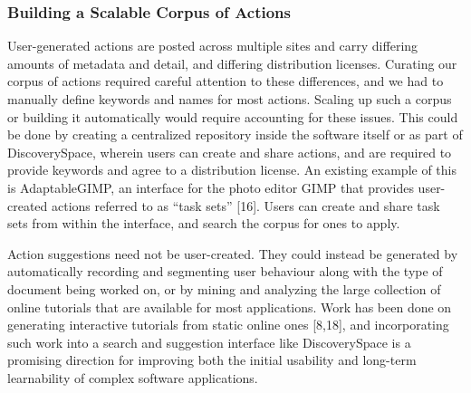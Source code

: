 \subsubsection{Building a Scalable Corpus of Actions}
User-generated actions are posted across multiple sites and carry differing amounts of metadata and detail, and differing distribution licenses. Curating our corpus of actions required careful attention to these differences, and we had to manually define keywords and names for most actions. Scaling up such a corpus or building it automatically would require accounting for these issues. This could be done by creating a centralized repository inside the software itself or as part of Discovery\-Space, wherein users can create and share actions, and are required to provide keywords and agree to a distribution license. An existing example of this is AdaptableGIMP, an interface for the photo editor GIMP that provides user-created actions referred to as ``task sets'' [16]. Users can create and share task sets from within the interface, and search the corpus for ones to apply.

Action suggestions need not be user-created. They could instead be generated by automatically recording and segmenting user behaviour along with the type of document being worked on, or by mining and analyzing the large collection of online tutorials that are available for most applications. Work has been done on generating interactive tutorials from static online ones [8,18], and incorporating such work into a search and suggestion interface like Discovery\-Space is a promising direction for improving both the initial usability and long-term learnability of complex software applications.
